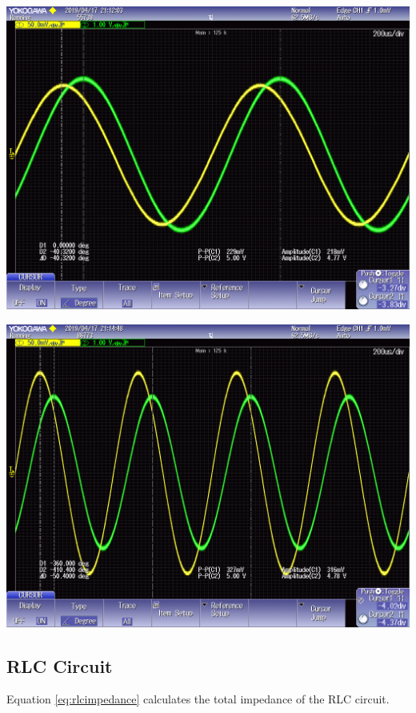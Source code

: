 \documentclass[journal]{IEEEtran}
\begin{document}
\begingroup
    \centering
    \medskip
    \includegraphics[width=\columnwidth]{images/lab8_014.png}
    \label{fig:rlosc1}
    \medskip
\endgroup

\begingroup
    \centering
    \medskip
    \includegraphics[width=\columnwidth]{images/lab8_017.png}
    \label{fig:rlosc2}
    \medskip
\endgroup


\subsection{RLC Circuit}
Equation \ref{eq:rlcimpedance} calculates the total impedance of the RLC circuit.\\
\end{document}

